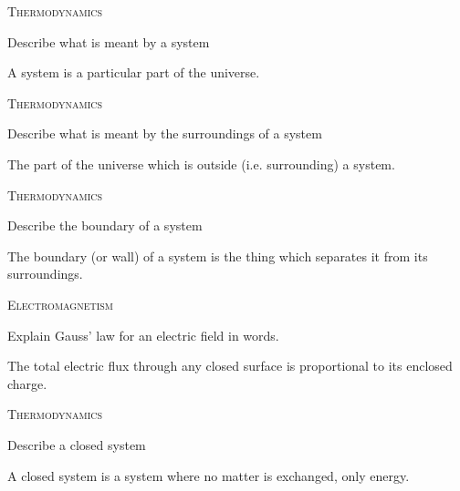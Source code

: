 \documentclass{article}
\newenvironment{flashcard}[2][]
  {\noindent\textsc{\Large#1}\par\vfill
   {\centering\Large#2\par}
   \vfill
   \newpage\Large\centering
  }
  {\newpage}
\begin{document}

\begin{flashcard}[Thermodynamics]{Describe what is meant by a system}

A system is a particular part of the universe.
\newline

\end{flashcard}


\begin{flashcard}[Thermodynamics]{Describe what is meant by the surroundings of a system}

The part of the universe which is outside (i.e. surrounding) a system.
\end{flashcard}



\begin{flashcard}[Thermodynamics]{Describe the boundary of a system}

The boundary (or wall) of a system is the thing which separates it from its surroundings. 

\end{flashcard}



\begin{flashcard}[Electromagnetism]{Explain Gauss' law for an electric field in words.}

The total electric flux through any closed surface is proportional to its enclosed charge.
\end{flashcard}


\begin{flashcard}[Thermodynamics]{Describe a closed system}

A closed system is a system where no matter is exchanged, only energy.
\end{flashcard}
\end{document}
